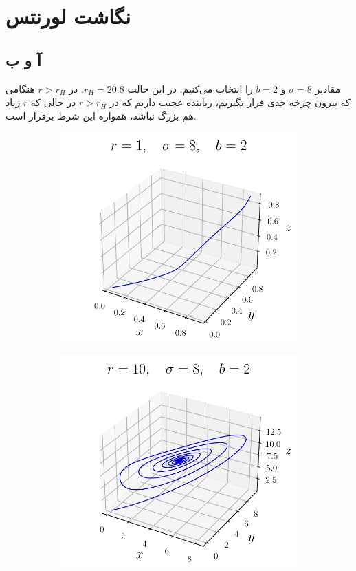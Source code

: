 \documentclass[12pt,a4paper]{article}
\begin{document}
	\section{نگاشت لورنتس}
	\subsection{آ و ب}
	مقادیر $\sigma = 8 $ و $b = 2 $ را انتخاب می‌کنیم. در این حالت $r_H = 20.8 $. در $r > r_H$ هنگامی که بیرون چرخه
	حدی قرار بگیریم، رباینده عجیب داریم که در $r > r_H$ در حالی که $r$ زیاد هم بزرگ نباشد، همواره این شرط برقرار است.
	\begin{figure}[h!]
		\centering
		\begin{LTR}
			\begin{subfigure}{0.49\linewidth}
				\centering
				\includegraphics[width=\linewidth]{fig/lorenz1-3d}
			\end{subfigure}
			\begin{subfigure}{0.49\linewidth}
				\centering
				\includegraphics[width=\linewidth]{fig/lorenz2-3d}

\end{subfigure}
\end{LTR}
\end{figure}
\end{document}
